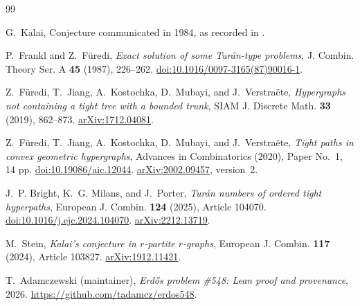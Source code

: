 \documentclass[11pt]{article}
\numberwithin{equation}{section}
\theoremstyle{definition}
\begin{document}
\begin{thebibliography}{99}

G.~Kalai,
Conjecture communicated in 1984, as recorded in
\cite[Conjecture~3.6 and reference~{[K2]}]{FF1987}.

P.~Frankl and Z.~F\"uredi,
\emph{Exact solution of some Tur\'an-type problems},
J. Combin. Theory Ser. A \textbf{45} (1987), 226--262.
\href{https://doi.org/10.1016/0097-3165(87)90016-1}
{doi:10.1016/0097-3165(87)90016-1}.

Z.~F\"uredi, T.~Jiang, A.~Kostochka, D.~Mubayi, and J.~Verstra\"ete,
\emph{Hypergraphs not containing a tight tree with a bounded trunk},
SIAM J. Discrete Math. \textbf{33} (2019), 862--873.
\href{https://arxiv.org/abs/1712.04081}{arXiv:1712.04081}.

Z.~F\"uredi, T.~Jiang, A.~Kostochka, D.~Mubayi, and J.~Verstra\"ete,
\emph{Tight paths in convex geometric hypergraphs},
Advances in Combinatorics (2020), Paper No.~1, 14 pp.
\href{https://doi.org/10.19086/aic.12044}{doi:10.19086/aic.12044}.
\href{https://arxiv.org/abs/2002.09457}{arXiv:2002.09457}, version~2.

J.~P. Bright, K.~G. Milans, and J.~Porter,
\emph{Tur\'an numbers of ordered tight hyperpaths},
European J. Combin. \textbf{124} (2025), Article 104070.
\href{https://doi.org/10.1016/j.ejc.2024.104070}{doi:10.1016/j.ejc.2024.104070}.
\href{https://arxiv.org/abs/2212.13719}{arXiv:2212.13719}.

M.~Stein,
\emph{Kalai's conjecture in $r$-partite $r$-graphs},
European J. Combin. \textbf{117} (2024), Article 103827.
\href{https://arxiv.org/abs/1912.11421}{arXiv:1912.11421}.

T.~Adamczewski (maintainer),
\emph{Erd\H{o}s problem \#548: Lean proof and provenance}, 2026.
\url{https://github.com/tadamcz/erdos548}.

\end{thebibliography}
\end{document}
